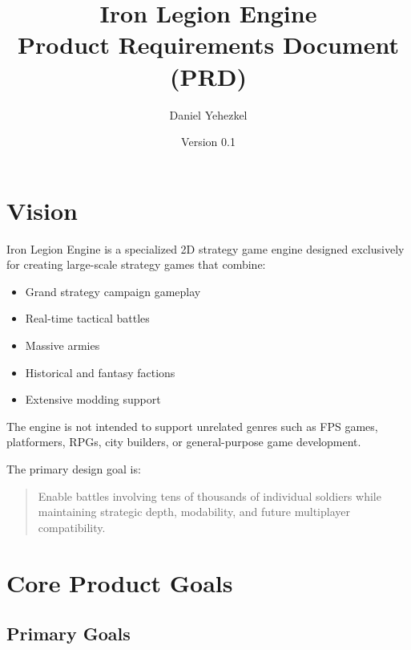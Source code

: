 \documentclass[11pt,a4paper]{article}
\title{
Iron Legion Engine \\
Product Requirements Document (PRD)
}
\author{Daniel Yehezkel}
\date{Version 0.1}
\begin{document}
\maketitle

\tableofcontents

\newpage

\section{Vision}

Iron Legion Engine is a specialized 2D strategy game engine designed exclusively for creating large-scale strategy games that combine:

\begin{itemize}

    \item Grand strategy campaign gameplay

    \item Real-time tactical battles

    \item Massive armies

    \item Historical and fantasy factions

    \item Extensive modding support

\end{itemize}

The engine is not intended to support unrelated genres such as FPS games, platformers, RPGs, city builders, or general-purpose game development.

The primary design goal is:

\begin{quote}

Enable battles involving tens of thousands of individual soldiers while maintaining strategic depth, modability, and future multiplayer compatibility.

\end{quote}

\section{Core Product Goals}

\subsection{Primary Goals}
\end{document}

